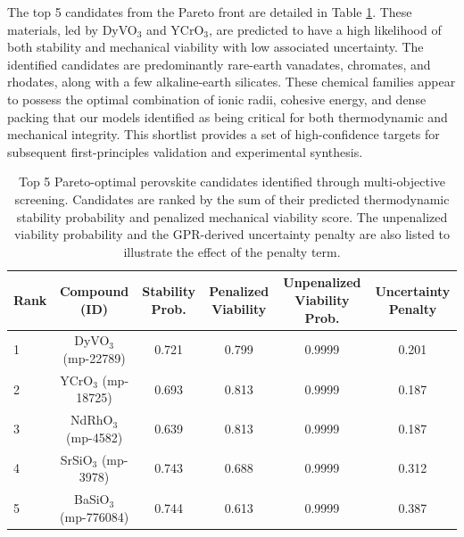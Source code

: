 \documentclass[]{article}
\begin{document}
The top 5 candidates from the Pareto front are detailed in Table \ref{tab:candidates}. These materials, led by DyVO$_3$ and YCrO$_3$, are predicted to have a high likelihood of both stability and mechanical viability with low associated uncertainty. The identified candidates are predominantly rare-earth vanadates, chromates, and rhodates, along with a few alkaline-earth silicates. These chemical families appear to possess the optimal combination of ionic radii, cohesive energy, and dense packing that our models identified as being critical for both thermodynamic and mechanical integrity. This shortlist provides a set of high-confidence targets for subsequent first-principles validation and experimental synthesis.

\begin{table}[t]
\centering
\caption{Top 5 Pareto-optimal perovskite candidates identified through multi-objective screening. Candidates are ranked by the sum of their predicted thermodynamic stability probability and penalized mechanical viability score. The unpenalized viability probability and the GPR-derived uncertainty penalty are also listed to illustrate the effect of the penalty term.}
\label{tab:candidates}
\begin{tabular}{lccccc}
\hline
\hline
Rank & Compound (ID) & Stability Prob. & Penalized Viability & Unpenalized Viability Prob. & Uncertainty Penalty \\
\hline
1 & DyVO$_3$ (mp-22789) & 0.721 & 0.799 & 0.9999 & 0.201 \\
2 & YCrO$_3$ (mp-18725) & 0.693 & 0.813 & 0.9999 & 0.187 \\
3 & NdRhO$_3$ (mp-4582) & 0.639 & 0.813 & 0.9999 & 0.187 \\
4 & SrSiO$_3$ (mp-3978) & 0.743 & 0.688 & 0.9999 & 0.312 \\
5 & BaSiO$_3$ (mp-776084) & 0.744 & 0.613 & 0.9999 & 0.387 \\
\hline
\end{tabular}
\end{table}
\end{document}
